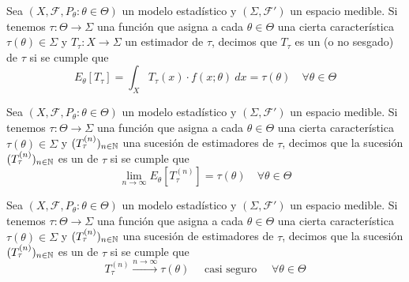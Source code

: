 \begin{definicion}
    Sea $(X,\mathcal{F},P_{\theta}:\theta \in \Theta)$ un modelo estadístico y $(\Sigma, \mathcal{F}')$ un espacio medible. Si tenemos $\tau:\Theta \to \Sigma$ una función que asigna a cada $\theta\in \Theta$ una cierta característica $\tau(\theta)\in \Sigma$ y $T_{\tau}:X\to \Sigma$ un estimador de $\tau$, decimos que $T_{\tau}$ es un  (o no sesgado) de $\tau$ si se cumple que
    \begin{equation*}
        E_{\theta}[T_{\tau}] =\int_{X}T_{\tau}(x)\cdot f(x;\theta)\ dx= \tau(\theta) \quad \forall \theta \in \Theta
    \end{equation*}
\end{definicion}

\begin{definicion}
    Sea $(X,\mathcal{F},P_{\theta}:\theta \in \Theta)$ un modelo estadístico y $(\Sigma, \mathcal{F}')$ un espacio medible. Si tenemos $\tau:\Theta \to \Sigma$ una función que asigna a cada $\theta\in \Theta$ una cierta característica $\tau(\theta)\in \Sigma$ y $(T_{\tau}^{(n)})_{n\in \mathbb{N}}$ una sucesión de estimadores de $\tau$, decimos que la sucesión $(T_\tau^{(n)})_{n\in \mathbb{N}}$ es un  de $\tau$ si se cumple que
    \begin{equation*}
        \lim\limits_{n\to \infty} E_{\theta}[T_{\tau}^{(n)}] = \tau(\theta) \quad \forall \theta \in \Theta
    \end{equation*}
\end{definicion}

\begin{definicion}
    Sea $(X,\mathcal{F},P_{\theta}:\theta \in \Theta)$ un modelo estadístico y $(\Sigma, \mathcal{F}')$ un espacio medible. Si tenemos $\tau:\Theta \to \Sigma$ una función que asigna a cada $\theta\in \Theta$ una cierta característica $\tau(\theta)\in \Sigma$ y $(T_{\tau}^{(n)})_{n\in \mathbb{N}}$ una sucesión de estimadores de $\tau$, decimos que la sucesión $(T_\tau^{(n)})_{n\in \mathbb{N}}$ es un  de $\tau$ si se cumple que
    \begin{equation*}
        T_{\tau}^{(n)} \xrightarrow{n\to \infty} \tau(\theta) \quad \text{ casi seguro } \quad \forall \theta \in \Theta
    \end{equation*}
\end{definicion}

